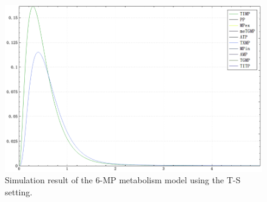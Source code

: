 \documentclass[journal,a4paper,onecolumn]{article}
\begin{document}
\begin{figure}[!hbt]
	\begin{center}
		\includegraphics[width=\columnwidth]{fig56}
		\caption{Simulation result of the 6-MP metabolism model using the T-S setting.}
		\label{fig:Simulation result of 6-MP metabolism using T-S.}
	\end{center}
\end{figure}


\clearpage


 
\end{document}
